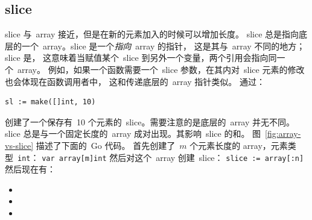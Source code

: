 \subsection{slice}
\label{sec:slices}
slice 与~array 接近，但是在新的元素加入的时候可以增加长度。
slice 总是指向底层的一个~array。slice 是一个\emph{指向}~array 的指针，
这是其与~array 不同的地方；
slice 是，
这意味着当赋值某个~slice 到另外一个变量，两个引用会指向同一个~array。
例如，如果一个函数需要一个~slice 参数，在其内对~slice 元素的修改也会体现在函数调用者中，
这和传递底层的~array 指针类似。
通过：
\begin{lstlisting}
sl := make([]int, 10)
\end{lstlisting}
创建了一个保存有~10 个元素的~slice。需要注意的是底层的~array 并无不同。
slice 总是与一个固定长度的~array 成对出现。其影响~slice 
的和。
图~\ref{fig:array-vs-slice} 描述了下面的~Go 代码。
首先创建了~$m$ 个元素长度的 array，元素类型~\lstinline{int}：
\lstinline{var array[m]int}\newline
然后对这个~array 创建~slice：
\lstinline{slice := array[:n]}\newline
然后现在有：
\begin{itemize}
    \item[\lstinline{len(slice) == n}{} ;]
    \item[\lstinline{cap(slice) == m}{} ;]
    \item[\lstinline{len(array) == cap(array) == m}{} .]
\end{itemize}
